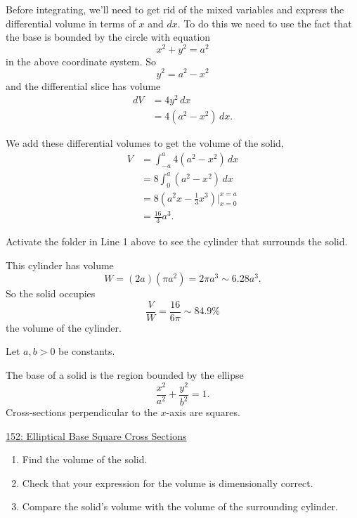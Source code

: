 \documentclass{ximera}
\begin{document}
\begin{question}
\begin{explanation}
Before integrating, we'll need to get rid of the mixed variables and express the differential volume in terms of $x$ and $dx$. To do this we need to use the fact that the base is bounded by the circle with equation
\[
      x^2 + y^2 = a^2
\]
in the above coordinate system. So
\[
      y^2 = a^2 - x^2
\]
and the differential slice has volume
\begin{align*}
  dV & = 4y^2 \, dx \\
       &= 4(a^2-x^2)\, dx .
\end{align*}

We add these differential volumes to get the volume of the solid,
\begin{align*}
   V &= \int_{-a}^a 4(a^2-x^2)\, dx \\
      &= 8 \int_0^a (a^2-x^2)\, dx \\
      &= 8 \left( a^2x - \frac{1}{3}x^3 \right) \Big|_{x=0}^{x=a} \\
      &= \frac{16}{3}a^3 .
\end{align*}


\item Activate the folder in Line 1 above to see the cylinder that surrounds the solid. 

This cylinder has volume
\[
 W = (2  a) (\pi a^2) = 2\pi a^3  \sim 6.28 a^3.
\]
So the solid occupies
\[
  \frac{V}{W} = \frac{16}{6\pi} \sim 84.9\%
\]
the volume of the cylinder.
\end{explanation}
\end{question}


\begin{question} \label{QoFDerf323f}
Let $a,b>0$ be constants.

The base of a solid is the region bounded by the ellipse
\[
    \frac{x^2}{a^2} + \frac{y^2}{b^2} = 1.
\]
Cross-sections perpendicular to the $x$-axis are squares. 

\begin{onlineOnly}
    \begin{center}
\end{center}
\end{onlineOnly}

\href{https://www.desmos.com/3d/zbcupsnbjv}{152: Elliptical Base Square Cross Sections}


\begin{enumerate}
\item Find the volume of the solid.

\item Check that your expression for the volume is dimensionally correct.

\item Compare the solid's volume with the volume of the surrounding cylinder.

\end{enumerate} 

\end{question}
\end{document}
